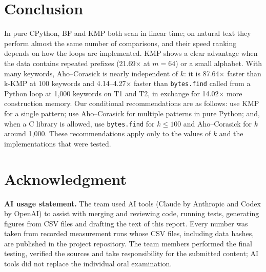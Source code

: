 \documentclass[conference]{IEEEtran}
\begin{document}
\section{Conclusion}
In pure CPython, BF and KMP both scan in linear time; on natural text they perform almost the same number of comparisons, and their speed ranking depends on how the loops are implemented. KMP shows a clear advantage when the data contains repeated prefixes (21.69$\times$ at $m=64$) or a small alphabet. With many keywords, Aho--Corasick is nearly independent of $k$: it is 87.64$\times$ faster than k-KMP at 100 keywords and 4.14--4.27$\times$ faster than \texttt{bytes.find} called from a Python loop at 1{,}000 keywords on T1 and T2, in exchange for 14.02$\times$ more construction memory. Our conditional recommendations are as follows: use KMP for a single pattern; use Aho--Corasick for multiple patterns in pure Python; and, when a C library is allowed, use \texttt{bytes.find} for $k\le 100$ and Aho--Corasick for $k$ around 1{,}000. These recommendations apply only to the values of $k$ and the implementations that were tested.

\section*{Acknowledgment}
\textbf{AI usage statement.} The team used AI tools (Claude by Anthropic and Codex by OpenAI) to assist with merging and reviewing code, running tests, generating figures from CSV files and drafting the text of this report. Every number was taken from recorded measurement runs whose CSV files, including data hashes, are published in the project repository. The team members performed the final testing, verified the sources and take responsibility for the submitted content; AI tools did not replace the individual oral examination.
\end{document}
